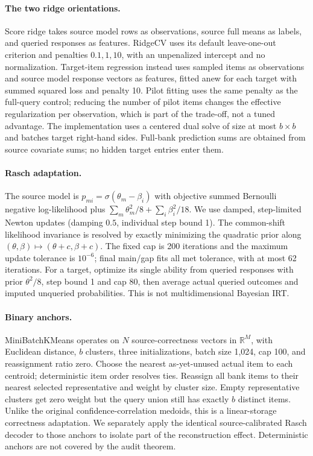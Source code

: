 \paragraph{The two ridge orientations.}
Score ridge takes source model rows as observations, source full means as labels, and queried responses as features. RidgeCV uses its default leave-one-out criterion and penalties $0.1,1,10$, with an unpenalized intercept and no normalization. Target-item regression instead uses sampled items as observations and source model response vectors as features, fitted anew for each target with summed squared loss and penalty 10. Pilot fitting uses the same penalty as the full-query control; reducing the number of pilot items changes the effective regularization per observation, which is part of the trade-off, not a tuned advantage. The implementation uses a centered dual solve of size at most $b\times b$ and batches target right-hand sides. Full-bank prediction sums are obtained from source covariate sums; no hidden target entries enter them.

\paragraph{Rasch adaptation.}
The source model is $p_{mi}=\sigma(\theta_m-\beta_i)$ with objective summed Bernoulli negative log-likelihood plus $\sum_m\theta_m^2/8+\sum_i\beta_i^2/18$. We use damped, step-limited Newton updates (damping $0.5$, individual step bound 1). The common-shift likelihood invariance is resolved by exactly minimizing the quadratic prior along $(\theta,\beta)\mapsto(\theta+c,\beta+c)$. The fixed cap is 200 iterations and the maximum update tolerance is $10^{-6}$; final main/gap fits all met tolerance, with at most 62 iterations. For a target, optimize its single ability from queried responses with prior $\theta^2/8$, step bound 1 and cap 80, then average actual queried outcomes and imputed unqueried probabilities. This is not multidimensional Bayesian IRT.

\paragraph{Binary anchors.}
MiniBatchKMeans operates on $N$ source-correctness vectors in $\mathbb R^M$, with Euclidean distance, $b$ clusters, three initializations, batch size 1,024, cap 100, and reassignment ratio zero. Choose the nearest as-yet-unused actual item to each centroid; deterministic item order resolves ties. Reassign all bank items to their nearest selected representative and weight by cluster size. Empty representative clusters get zero weight but the query union still has exactly $b$ distinct items. Unlike the original confidence-correlation medoids, this is a linear-storage correctness adaptation. We separately apply the identical source-calibrated Rasch decoder to those anchors to isolate part of the reconstruction effect. Deterministic anchors are not covered by the audit theorem.

